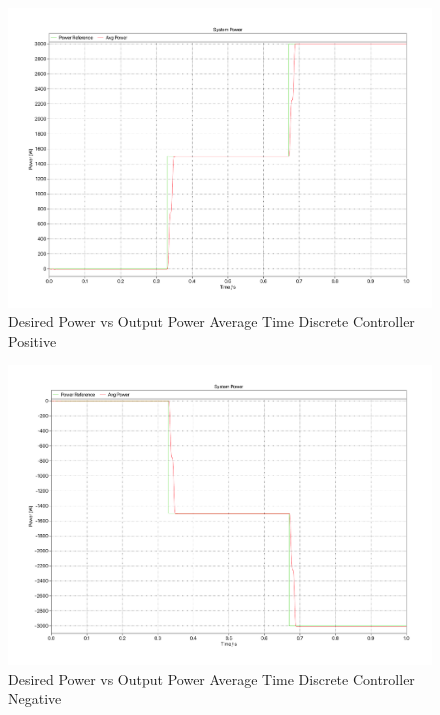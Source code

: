 \documentclass[12pt]{article}
\begin{document}
\begin{figure}[ht]
    \centering{}
    \includegraphics[width=\textwidth, height=0.4\textheight, keepaspectratio]{img/Average Time Z-C Power Positive.pdf}
    \caption{Desired Power vs Output Power Average Time Discrete Controller Positive}
    \label{fig:avg-time-z-c-power-positive}
\end{figure}

\begin{figure}[ht]
    \centering{}
    \includegraphics[width=\textwidth, height=0.4\textheight, keepaspectratio]{img/Average Time Z-C Power Negative.pdf}
    \caption{Desired Power vs Output Power Average Time Discrete Controller Negative}
    \label{fig:avg-time-z-c-power-negative}
\end{figure}
\end{document}
